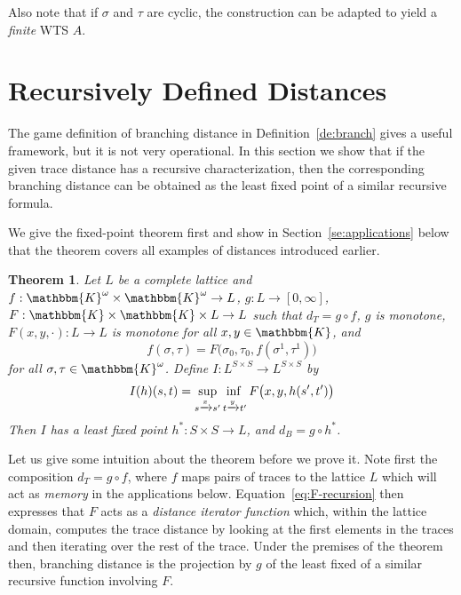 \documentclass[copyright,creativecommons,sharealike]{eptcs}
\theoremstyle{plain}
\newtheorem{theorem}{Theorem}
\renewcommand*\K{\mathbbm{K}}
\newcommand*\tto[1]{\xrightarrow{#1}}
\begin{document}
Also note that if $\sigma$ and $\tau$ are cyclic, the construction can
be adapted to yield a \emph{finite} WTS $A$.

\section{Recursively Defined Distances}
\label{sec:special}

The game definition of branching distance in
Definition~\ref{de:branch} gives a useful framework, but it is not
very operational.  In this section we show that if the given trace
distance has a recursive characterization, then the corresponding
branching distance can be obtained as the least fixed point of a
similar recursive formula.

We give the fixed-point theorem first and show in
Section~\ref{se:applications} below that the theorem covers all
examples of distances introduced earlier.

\begin{theorem}
  \label{th:F-recursion}
  Let $L$ be a complete lattice and $f: \K^\omega\times \K^\omega\to
  L$, $g: L\to[ 0, \infty]$, $F: \K\times \K\times L\to L$ such that
  $d_T= g\circ f$, $g$ is monotone, $F( x, y, \cdot): L\to L$ is
  monotone for all $x, y\in \K$, and
  \begin{equation}
    \label{eq:F-recursion}
    f( \sigma, \tau)= F\big( \sigma_0, \tau_0, f( \sigma^1,
    \tau^1)\big)
  \end{equation}
  for all $\sigma, \tau\in \K^\omega$.  Define $I: L^{ S\times S}\to
  L^{ S\times S}$ by
  \begin{equation*}
    I( h)( s, t)= \adjustlimits \sup_{ s\tto x s'} \inf_{ t\tto y t'}
    F\big( x, y, h( s', t')\big)
  \end{equation*}
  Then $I$ has a least fixed point $h^*: S\times S\to L$, and $d_B=
  g\circ h^*$.
\end{theorem}

Let us give some intuition about the theorem before we prove it.  Note
first the composition $d_T= g\circ f$, where $f$ maps pairs of traces
to the lattice $L$ which will act as \emph{memory} in the applications
below.  Equation~\eqref{eq:F-recursion} then expresses that $F$ acts
as a \emph{distance iterator function} which, within the lattice
domain, computes the trace distance by looking at the first elements
in the traces and then iterating over the rest of the trace.  Under
the premises of the theorem then, branching distance is the projection
by $g$ of the least fixed of a similar recursive function involving
$F$.
\end{document}
